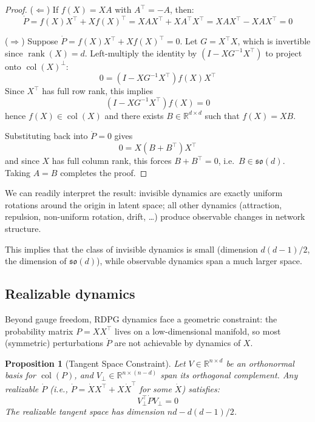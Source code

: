 \documentclass{article}
\newcommand{\RR}{\mathbb{R}}
\newcommand{\so}{\mathfrak{so}}
\DeclareMathOperator{\col}{col}
\DeclareMathOperator{\rank}{rank}
\theoremstyle{plain}
\newtheorem{proposition}{Proposition}
\theoremstyle{definition}
\theoremstyle{remark}
\begin{document}
\begin{proof}
($\Leftarrow$) If $f(X) = XA$ with $A^\top = -A$, then:
\begin{equation}
\dot{P} = f(X) X^\top + X f(X)^\top = XAX^\top + XA^\top X^\top = XAX^\top - XAX^\top = 0
\end{equation}

($\Rightarrow$) Suppose $\dot{P} = f(X) X^\top + X f(X)^\top = 0$.
Let $G = X^\top X$, which is invertible since $\rank(X)=d$.
Left-multiply the identity by $(I - XG^{-1}X^\top)$ to project onto $\col(X)^\perp$:
\begin{equation}
0 = (I - XG^{-1}X^\top) f(X) X^\top
\end{equation}
Since $X^\top$ has full row rank, this implies
\begin{equation}
(I - XG^{-1}X^\top) f(X) = 0
\end{equation}
hence $f(X) \in \col(X)$ and there exists $B \in \RR^{d \times d}$ such that $f(X) = XB$.

Substituting back into $\dot{P}=0$ gives
\begin{equation}
0 = X(B + B^\top) X^\top
\end{equation}
and since $X$ has full column rank, this forces $B + B^\top = 0$, i.e.\ $B \in \so(d)$.
Taking $A = B$ completes the proof.
\end{proof}

We can readily interpret the result: invisible dynamics are exactly uniform rotations around the origin in latent space; all other dynamics (attraction, repulsion, non-uniform rotation, drift, \ldots) produce observable changes in network structure.

This implies that the class of invisible dynamics is small (dimension $d(d-1)/2$, the dimension of $\so(d)$), while observable dynamics span a much larger space.


\subsection{Realizable dynamics}\label{sec:realizable}

Beyond gauge freedom, RDPG dynamics face a geometric constraint: the probability matrix $P = XX^\top$ lives on a low-dimensional manifold, so most (symmetric) perturbations $\dot{P}$ are not achievable by dynamics of $X$.

\begin{proposition}[Tangent Space Constraint]\label{prop:tangent}
Let $V \in \RR^{n \times d}$ be an orthonormal basis for $\col(P)$, and $V_\perp \in \RR^{n \times (n-d)}$ span its orthogonal complement.
Any realizable $\dot{P}$ (i.e., $\dot{P} = \dot{X} X^\top + X \dot{X}^\top$ for some $\dot{X}$) satisfies:
\begin{equation}
V_\perp^\top \dot{P} V_\perp = 0
\end{equation}
The realizable tangent space has dimension $nd - d(d-1)/2$.
\end{proposition}
\end{document}
